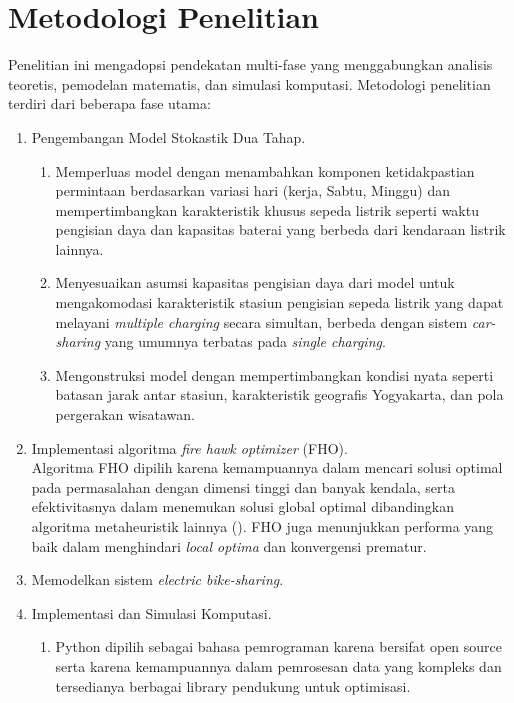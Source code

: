 \section{Metodologi Penelitian}
Penelitian ini mengadopsi pendekatan multi-fase yang menggabungkan analisis teoretis, pemodelan matematis, dan simulasi komputasi. Metodologi penelitian terdiri dari beberapa fase utama:
\begin{enumerate}
    \item Pengembangan Model Stokastik Dua Tahap.
    \begin{enumerate}
        \item Memperluas model  dengan menambahkan komponen ketidakpastian permintaan berdasarkan variasi hari (kerja, Sabtu, Minggu) dan mempertimbangkan karakteristik khusus sepeda listrik seperti waktu pengisian daya dan kapasitas baterai yang berbeda dari kendaraan listrik lainnya.
        \item Menyesuaikan asumsi kapasitas pengisian daya dari model  untuk mengakomodasi karakteristik stasiun pengisian sepeda listrik yang dapat melayani \textit{multiple charging} secara simultan, berbeda dengan sistem \textit{car-sharing} yang umumnya terbatas pada \textit{single charging}. 
    
        \item Mengonstruksi model dengan mempertimbangkan kondisi nyata seperti batasan jarak antar stasiun, karakteristik geografis Yogyakarta, dan pola pergerakan wisatawan.
    \end{enumerate}
    
    \item Implementasi algoritma \textit{fire hawk optimizer} (FHO). \\ Algoritma FHO dipilih karena kemampuannya dalam mencari solusi optimal pada permasalahan dengan dimensi tinggi dan banyak kendala, serta efektivitasnya dalam menemukan solusi global optimal dibandingkan algoritma metaheuristik lainnya (). FHO juga menunjukkan performa yang baik dalam menghindari \textit{local optima} dan konvergensi prematur.
    
    \item Memodelkan sistem \textit{electric bike-sharing}.
    
    \item Implementasi dan Simulasi Komputasi.
    \begin{enumerate}
        \item Python dipilih sebagai bahasa pemrograman karena bersifat open source serta karena kemampuannya dalam pemrosesan data yang kompleks dan tersedianya berbagai library pendukung untuk optimisasi.
        

\end{enumerate}
\end{enumerate}
